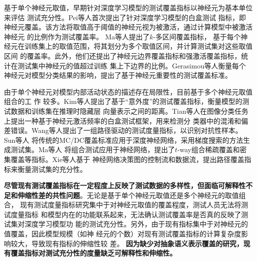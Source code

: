 \fi






{基于单个神经元取值}，早期针对深度学习模型的测试覆盖指标以神经元为基本单位来评估
测试充分性。Pei等人首次提出了针对深度学习模型的白盒测试
指标，即神经元覆盖。该方法将取值高于阈值的神经元视为被激活，通过计算模型中被激活神经元
的比例作为测试覆盖率。 Ma等人提出了$k$-多区间覆盖指标，
基于每个神经元在训练集上的取值范围，将其划分为多个取值区间，并计算测试集对这些取值区间
的覆盖率。此外，他们还提出了神经元边界覆盖指标和强激活覆盖指标，统计在测试集中神经元的值超过训练
集上下边界的比例。Gerasimou等人衡量每个
神经元对模型分类结果的影响，提出了基于神经元重要性的测试覆盖标准。

由于单个神经元对模型内部活动状态的描述存在局限性，目前基于多个神经元取值组合的工
作
较多。Kim等人提出了基于“意外度”的测试覆盖指标，衡量模型的测试数据和训练集在推理时隐藏层
向量表示之间的距离。Tian等人在图像分类任务上提出一种基于神经元激活频率的白盒测试框架，用来检测分
类器中的混淆和偏差错误。Wang等人提出了一组路径驱动的测试度量指标，以识别对抗性样本。Sun等人
将传统的MC/DC覆盖标准应用于深度神经网络，采用梯度搜索的方法生成测试集。Ma等人
将组合测试应用于神经网络，提出了$t$-way组合稀疏覆盖和密集覆盖等指标。Xie等人基于
神经网络决策图的控制流和数据流，提出路径覆盖指标来衡量测试集的充分性。

\textbf{尽管现有测试覆盖指标在一定程度上反映了测试数据的多样性，但面临可解释性不
	足和伸缩性差的共性问题}。无论是基于单个神经元取值还是多个神经元的取值组合，
	现有测试度量指标研究集中于对神经元取值的覆盖程度，测试人员无法将测试度量指标
	和模型内在的功能联系起来，无法确认测试覆盖率是否真的反映了测试集对深度学习模型功
	能的测试充分性。另外，由于现有指标集中于对神经元的值覆盖，因此模型规模（如神
	经元的个数）对现有测试覆盖指标的计算复杂度影响较大，导致现有指标的伸缩性较
	差。
\textbf{因为缺少对抽象语义表示覆盖的研究，现有覆盖指标对测试充分性的度量缺乏可解释性和伸缩性。}

